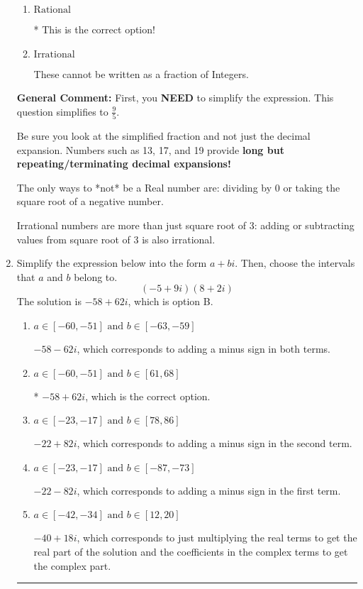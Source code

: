 \documentclass{extbook}[14pt]
\newcommand{\litem}[1]{\item #1

\rule{\textwidth}{0.4pt}}
\begin{document}
\begin{enumerate}
{\begin{enumerate}[label=\Alph*.]
These are the negative and positive counting numbers (..., -3, -2, -1, 0, 1, 2, 3, ...)
\item \( \text{Rational} \)

* This is the correct option!
\item \( \text{Irrational} \)

These cannot be written as a fraction of Integers.
\end{enumerate}

\textbf{General Comment:} First, you \textbf{NEED} to simplify the expression. This question simplifies to $\frac{9}{5}$. 
 
 Be sure you look at the simplified fraction and not just the decimal expansion. Numbers such as 13, 17, and 19 provide \textbf{long but repeating/terminating decimal expansions!} 
 
 The only ways to *not* be a Real number are: dividing by 0 or taking the square root of a negative number. 
 
 Irrational numbers are more than just square root of 3: adding or subtracting values from square root of 3 is also irrational.
}
\litem{
Simplify the expression below into the form $a+bi$. Then, choose the intervals that $a$ and $b$ belong to.
\[ (-5 + 9 i)(8 + 2 i) \]The solution is \( -58 + 62 i \), which is option B.\begin{enumerate}[label=\Alph*.]
\item \( a \in [-60, -51] \text{ and } b \in [-63, -59] \)

 $-58 - 62 i$, which corresponds to adding a minus sign in both terms.
\item \( a \in [-60, -51] \text{ and } b \in [61, 68] \)

* $-58 + 62 i$, which is the correct option.
\item \( a \in [-23, -17] \text{ and } b \in [78, 86] \)

 $-22 + 82 i$, which corresponds to adding a minus sign in the second term.
\item \( a \in [-23, -17] \text{ and } b \in [-87, -73] \)

 $-22 - 82 i$, which corresponds to adding a minus sign in the first term.
\item \( a \in [-42, -34] \text{ and } b \in [12, 20] \)

 $-40 + 18 i$, which corresponds to just multiplying the real terms to get the real part of the solution and the coefficients in the complex terms to get the complex part.
\end{enumerate}

}
\end{enumerate}
\end{document}
